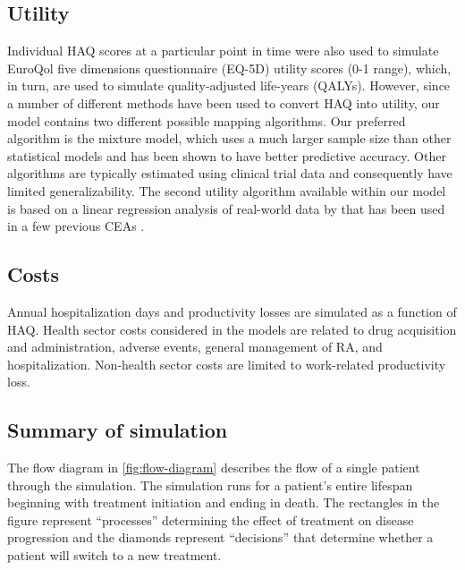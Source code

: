 \documentclass[11pt,final,fleqn]{article}
\theoremstyle{plain}
\begin{document}
\subsection{Utility}
Individual HAQ scores at a particular point in time were also used to simulate EuroQol five dimensions questionnaire (EQ-5D) utility scores (0-1 range), which, in turn, are used to simulate quality-adjusted life-years (QALYs). However, since a number of different methods have been used to convert HAQ into utility, our model contains two different possible mapping algorithms. Our preferred algorithm is the \citet{alava2013relationship} mixture model, which uses a much larger sample size than other statistical models and has been shown to have better predictive accuracy. Other algorithms are typically estimated using clinical trial data \citep[e.g.][]{carlson2015economic, stephens2015modelling} and consequently have limited generalizability. The second utility algorithm available within our model is based on a linear regression analysis of real-world data by \citet{wailoo2006modeling} that has been used in a few previous CEAs \citep[e.g.][]{wailoo2008biologic, icer2017tim}.

\subsection{Costs}
Annual hospitalization days and productivity losses are simulated as a function of HAQ. Health sector costs considered in the models are related to drug acquisition and administration, adverse events, general management of RA, and hospitalization. Non-health sector costs are limited to work-related productivity loss.

\subsection{Summary of simulation}
The flow diagram in \autoref{fig:flow-diagram} describes the flow of a single patient through the simulation. The simulation runs for a patient's entire lifespan beginning with treatment initiation and ending in death. The rectangles in the figure represent ``processes'' determining the effect of treatment on disease progression and the diamonds represent ``decisions'' that determine whether a patient will switch to a new treatment.
\end{document}
